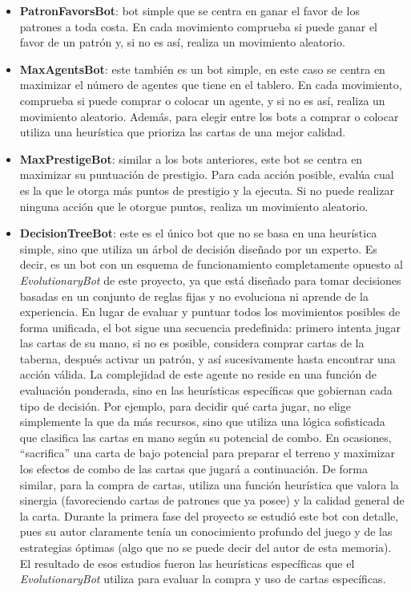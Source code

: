 \begin{itemize}
	\item \textbf{PatronFavorsBot}: bot simple que se centra en ganar el favor de los patrones a toda costa. En cada movimiento comprueba si puede ganar el favor de un patrón y, si no es así, realiza un movimiento aleatorio.
	\item \textbf{MaxAgentsBot}: este también es un bot simple, en este caso se centra en maximizar el número de agentes que tiene en el tablero. En cada movimiento, comprueba si puede comprar o colocar un agente, y si no es así, realiza un movimiento aleatorio. Además, para elegir entre los bots a comprar o colocar utiliza una heurística que prioriza las cartas de una mejor calidad.
	\item \textbf{MaxPrestigeBot}: similar a los bots anteriores, este bot se centra en maximizar su puntuación de prestigio. Para cada acción posible, evalúa cual es la que le otorga más puntos de prestigio y la ejecuta. Si no puede realizar ninguna acción que le otorgue puntos, realiza un movimiento aleatorio.
	\item \textbf{DecisionTreeBot}: este es el único bot que no se basa en una heurística simple, sino que utiliza un árbol de decisión diseñado por un experto. Es decir, es un bot con un esquema de funcionamiento completamente opuesto al \textit{EvolutionaryBot} de este proyecto, ya que está diseñado para tomar decisiones basadas en un conjunto de reglas fijas y no evoluciona ni aprende de la experiencia. En lugar de evaluar y puntuar todos los movimientos posibles de forma unificada, el bot sigue una secuencia predefinida: primero intenta jugar las cartas de su mano, si no es posible, considera comprar cartas de la taberna, después activar un patrón, y así sucesivamente hasta encontrar una acción válida. La complejidad de este agente no reside en una función de evaluación ponderada, sino en las heurísticas específicas que gobiernan cada tipo de decisión. Por ejemplo, para decidir qué carta jugar, no elige simplemente la que da más recursos, sino que utiliza una lógica sofisticada que clasifica las cartas en mano según su potencial de combo. En ocasiones, ``sacrifica'' una carta de bajo potencial para preparar el terreno y maximizar los efectos de combo de las cartas que jugará a continuación. De forma similar, para la compra de cartas, utiliza una función heurística que valora la sinergia (favoreciendo cartas de patrones que ya posee) y la calidad general de la carta. Durante la primera fase del proyecto se estudió este bot con detalle, pues su autor claramente tenía un conocimiento profundo del juego y de las estrategias óptimas (algo que no se puede decir del autor de esta memoria). El resultado de esos estudios fueron las heurísticas específicas que el \textit{EvolutionaryBot} utiliza para evaluar la compra y uso de cartas específicas.
\end{itemize}